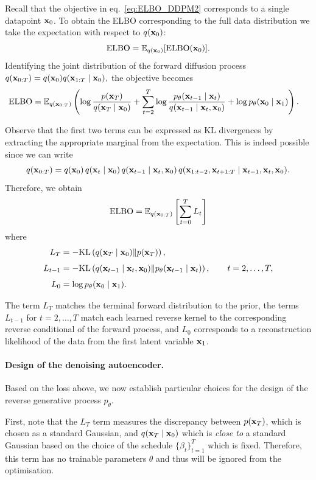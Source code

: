 Recall that the objective in eq.~\eqref{eq:ELBO_DDPM2} corresponds to a single datapoint ${ \mathbf{x}}_0$. To obtain the ELBO corresponding to the full data distribution we take the expectation with
respect to $q({ \mathbf{x}}_0)$:
\[
{\text{ELBO}} = \mathbb{E}_{q({ \mathbf{x}}_0)}[{\text{ELBO}}({ \mathbf{x}}_0)].
\]
Identifying the joint distribution of the forward diffusion process
\(
q({ \mathbf{x}}_{0:T}) = q({ \mathbf{x}}_0)q({ \mathbf{x}}_{1:T}\mid { \mathbf{x}}_0),
\)
the objective becomes
\begin{align}
{\text{ELBO}}
&=
\mathbb{E}_{q({ \mathbf{x}}_{0:T})}
\left(
\log\frac{p({ \mathbf{x}}_T)}{q({ \mathbf{x}}_T\mid { \mathbf{x}}_0)}
+
\sum_{t=2}^{T}\log\frac{p_\theta ({ \mathbf{x}}_{t-1} \mid { \mathbf{x}}_t)}{ q({ \mathbf{x}}_{t-1}\mid { \mathbf{x}}_t,{ \mathbf{x}}_0)}
+
\log p_\theta ({ \mathbf{x}}_{0} \mid { \mathbf{x}}_1)
\right).
\label{eq:ELBO_DDPM3}
\end{align}

Observe that the first two terms can be expressed as KL divergences by extracting the appropriate marginal  from the expectation. This is indeed possible since we can write 
\[
q({ \mathbf{x}}_{0:T})
=
q({ \mathbf{x}}_0)\,q({ \mathbf{x}}_t\mid { \mathbf{x}}_0)\,q({ \mathbf{x}}_{t-1}\mid { \mathbf{x}}_t,{ \mathbf{x}}_0)\,
q({ \mathbf{x}}_{1:t-2},{ \mathbf{x}}_{t+1:T}\mid { \mathbf{x}}_{t-1},{ \mathbf{x}}_t,{ \mathbf{x}}_0).
\]
Therefore, we obtain
\[
{\text{ELBO}} = \mathbb{E}_{q({ \mathbf{x}}_{0:T})} \left[\sum_{t=0}^{T} L_t\right]
\]
where
\begin{align*}
L_T
&=
-
\text{KL}\left(q({ \mathbf{x}}_T\mid { \mathbf{x}}_0)\middle\|p({ \mathbf{x}}_T)\right),\\[4pt]
L_{t-1}
&=
-
\text{KL}\left(q({ \mathbf{x}}_{t-1}\mid { \mathbf{x}}_t,{ \mathbf{x}}_0)\middle\|p_\theta({ \mathbf{x}}_{t-1}\mid { \mathbf{x}}_t)\right),
\qquad t=2,\dots,T,\\[4pt]
L_0
&=
\log p_\theta({ \mathbf{x}}_0\mid { \mathbf{x}}_1).
\end{align*}

\begin{remark}
    The term $L_T$ matches the terminal forward distribution to the prior, the terms $L_{t-1}$ for $t=2,\dots,T$ match each learned reverse kernel to the corresponding reverse conditional of the forward process, and $L_0$ corresponds to a reconstruction likelihood of the data from the first latent variable ${ \mathbf{x}}_1$.
\end{remark}

\paragraph{Design of the denoising autoencoder.} Based on the loss above, we now establish particular choices for the design of the reverse generative process $p_\theta$. 

First, note that the $L_T$ term measures the discrepancy between $p({ \mathbf{x}}_T)$, which is chosen as a standard Gaussian, and $q({ \mathbf{x}}_T \mid { \mathbf{x}}_0)$ which is \emph{close to} a standard Gaussian based on the choice of the schedule $\{\beta_t\}_{t=1}^T$ which is fixed. Therefore, this term has no trainable parameters $\theta$ and thus will be ignored from the optimisation. 

